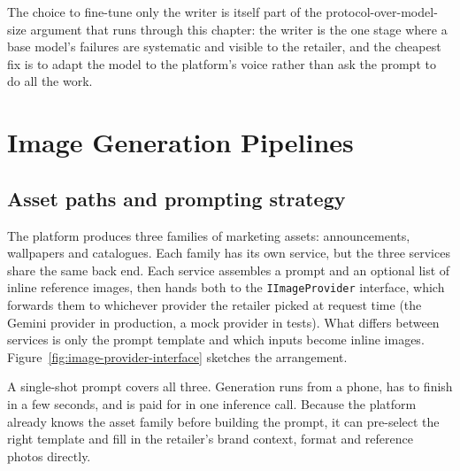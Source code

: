 The choice to fine-tune only the writer is itself part of the protocol-over-model-size argument that runs through this chapter: the writer is the one stage where a base model's failures are systematic and visible to the retailer, and the cheapest fix is to adapt the model to the platform's voice rather than ask the prompt to do all the work.

\section{Image Generation Pipelines}
\label{sec:hybrid-catalogue}

\subsection{Asset paths and prompting strategy}
\label{subsec:gen-overview}

The platform produces three families of marketing assets: announcements, wallpapers and catalogues. Each family has its own service, but the three services share the same back end. Each service assembles a prompt and an optional list of inline reference images, then hands both to the \texttt{IImageProvider} interface, which forwards them to whichever provider the retailer picked at request time (the Gemini provider in production, a mock provider in tests). What differs between services is only the prompt template and which inputs become inline images. Figure~\ref{fig:image-provider-interface} sketches the arrangement.

A single-shot prompt covers all three. Generation runs from a phone, has to finish in a few seconds, and is paid for in one inference call. Because the platform already knows the asset family before building the prompt, it can pre-select the right template and fill in the retailer's brand context, format and reference photos directly.

